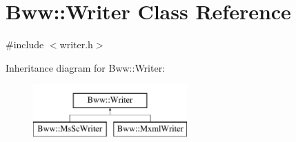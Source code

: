 \hypertarget{class_bww_1_1_writer}{}\section{Bww\+:\+:Writer Class Reference}
\label{class_bww_1_1_writer}


{\ttfamily \#include $<$writer.\+h$>$}

Inheritance diagram for Bww\+:\+:Writer\+:\begin{figure}[H]
\begin{center}
\leavevmode
\includegraphics[height=2.000000cm]{class_bww_1_1_writer}
\end{center}
\end{figure}
